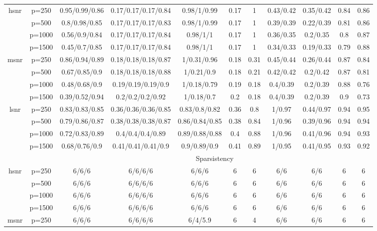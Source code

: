 \begin{table}[ht]
{\begin{tabular}{|c|c|ccccccccc|}
\midrule\multirow{4}[2]{*}{hsnr} & p=250 & 0.95/0.99/0.86 & 0.17/0.17/0.17/0.84 & 0.98/1/0.99 & 0.17 & 1 & 0.43/0.42 & 0.35/0.42 & 0.84 & 0.86 \\ 
   & p=500 & 0.8/0.98/0.85 & 0.17/0.17/0.17/0.83 & 0.98/1/0.99 & 0.17 & 1 & 0.39/0.39 & 0.22/0.39 & 0.81 & 0.86 \\ 
   & p=1000 & 0.56/0.9/0.84 & 0.17/0.17/0.17/0.84 & 0.98/1/1 & 0.17 & 1 & 0.36/0.35 & 0.2/0.35 & 0.8 & 0.87 \\ 
   & p=1500 & 0.45/0.7/0.85 & 0.17/0.17/0.17/0.84 & 0.98/1/1 & 0.17 & 1 & 0.34/0.33 & 0.19/0.33 & 0.79 & 0.88 \\ 
  \midrule\multirow{4}[2]{*}{msnr} & p=250 & 0.86/0.94/0.89 & 0.18/0.18/0.18/0.87 & 1/0.31/0.96 & 0.18 & 0.31 & 0.45/0.44 & 0.26/0.44 & 0.87 & 0.84 \\ 
   & p=500 & 0.67/0.85/0.9 & 0.18/0.18/0.18/0.88 & 1/0.21/0.9 & 0.18 & 0.21 & 0.42/0.42 & 0.2/0.42 & 0.87 & 0.81 \\ 
   & p=1000 & 0.48/0.68/0.9 & 0.19/0.19/0.19/0.9 & 1/0.18/0.79 & 0.19 & 0.18 & 0.4/0.39 & 0.2/0.39 & 0.88 & 0.76 \\ 
   & p=1500 & 0.39/0.52/0.94 & 0.2/0.2/0.2/0.92 & 1/0.18/0.7 & 0.2 & 0.18 & 0.4/0.39 & 0.2/0.39 & 0.9 & 0.73 \\ 
  \midrule\multirow{4}[2]{*}{lsnr} & p=250 & 0.83/0.83/0.85 & 0.36/0.36/0.36/0.85 & 0.83/0.8/0.82 & 0.36 & 0.8 & 1/0.97 & 0.44/0.97 & 0.94 & 0.95 \\ 
   & p=500 & 0.79/0.86/0.87 & 0.38/0.38/0.38/0.87 & 0.86/0.84/0.85 & 0.38 & 0.84 & 1/0.96 & 0.39/0.96 & 0.94 & 0.94 \\ 
   & p=1000 & 0.72/0.83/0.89 & 0.4/0.4/0.4/0.89 & 0.89/0.88/0.88 & 0.4 & 0.88 & 1/0.96 & 0.41/0.96 & 0.94 & 0.93 \\ 
   & p=1500 & 0.68/0.76/0.9 & 0.41/0.41/0.41/0.9 & 0.9/0.89/0.9 & 0.41 & 0.89 & 1/0.95 & 0.41/0.95 & 0.93 & 0.92 \\ 
   \midrule 
 \multicolumn{1}{|c}{} &       & \multicolumn{9}{c|}{Sparsistency} \\
\midrule\multirow{4}[2]{*}{hsnr} & p=250 & 6/6/6 & 6/6/6/6 & 6/6/6 & 6 & 6 & 6/6 & 6/6 & 6 & 6 \\ 
   & p=500 & 6/6/6 & 6/6/6/6 & 6/6/6 & 6 & 6 & 6/6 & 6/6 & 6 & 6 \\ 
   & p=1000 & 6/6/6 & 6/6/6/6 & 6/6/6 & 6 & 6 & 6/6 & 6/6 & 6 & 6 \\ 
   & p=1500 & 6/6/6 & 6/6/6/6 & 6/6/6 & 6 & 6 & 6/6 & 6/6 & 6 & 6 \\ 
  \midrule\multirow{4}[2]{*}{msnr} & p=250 & 6/6/6 & 6/6/6/6 & 6/4/5.9 & 6 & 4 & 6/6 & 6/6 & 6 & 6 \\ 

\end{tabular}}
\end{table}
